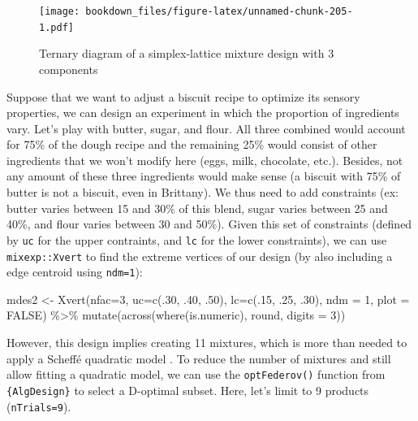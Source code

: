\documentclass[
]{krantz}
\makeatletter
\newenvironment{Shaded}{\begin{snugshade}}{\end{snugshade}}
\newcommand{\AttributeTok}[1]{\textcolor[rgb]{0.61,0.61,0.61}{#1}}
\newcommand{\ConstantTok}[1]{\textcolor[rgb]{0,0,0}{#1}}
\newcommand{\DecValTok}[1]{\textcolor[rgb]{0.06,0.06,0.06}{#1}}
\newcommand{\FunctionTok}[1]{\textcolor[rgb]{0,0,0}{#1}}
\newcommand{\NormalTok}[1]{#1}
\newcommand{\OtherTok}[1]{\textcolor[rgb]{0.37,0.37,0.37}{#1}}
\newcommand{\SpecialCharTok}[1]{\textcolor[rgb]{0,0,0}{#1}}
\newenvironment{kframe}{%
\medskip{}
\setlength{\fboxsep}{.8em}
 \def\at@end@of@kframe{}%
 \ifinner\ifhmode%
  \def\at@end@of@kframe{\end{minipage}}%
  \begin{minipage}{\columnwidth}%
 \fi\fi%
 \def\FrameCommand##1{\hskip\@totalleftmargin \hskip-\fboxsep
 \colorbox{shadecolor}{##1}\hskip-\fboxsep
     \hskip-\linewidth \hskip-\@totalleftmargin \hskip\columnwidth}%
 \MakeFramed {\advance\hsize-\width
   \@totalleftmargin\z@ \linewidth\hsize
   \@setminipage}}%
 {\par\unskip\endMakeFramed%
 \at@end@of@kframe}
\renewenvironment{Shaded}{\begin{kframe}}{\end{kframe}}
\makeatother
\begin{document}
\begin{figure}
\centering
\texttt{[image: bookdown\_files/figure-latex/unnamed-chunk-205-1.pdf]}
\caption{\label{fig:unnamed-chunk-205}Ternary diagram of a simplex-lattice mixture design with 3 components}
\end{figure}

Suppose that we want to adjust a biscuit recipe to optimize its sensory properties, we can design an experiment in which the proportion of ingredients vary. Let's play with butter, sugar, and flour. All three combined would account for 75\% of the dough recipe and the remaining 25\% would consist of other ingredients that we won't modify here (eggs, milk, chocolate, etc.). Besides, not any amount of these three ingredients would make sense (a biscuit with 75\% of butter is not a biscuit, even in Brittany). We thus need to add constraints (ex: butter varies between 15 and 30\% of this blend, sugar varies between 25 and 40\%, and flour varies between 30 and 50\%). Given this set of constraints (defined by \texttt{uc} for the upper contraints, and \texttt{lc} for the lower constraints), we can use \texttt{mixexp::Xvert} to find the extreme vertices of our design (by also including a edge centroid using \texttt{ndm=1}):

\begin{Shaded}
\begin{Highlighting}[]
\NormalTok{mdes2 }\OtherTok{\textless{}{-}} \FunctionTok{Xvert}\NormalTok{(}\AttributeTok{nfac=}\DecValTok{3}\NormalTok{, }\AttributeTok{uc=}\FunctionTok{c}\NormalTok{(.}\DecValTok{30}\NormalTok{, .}\DecValTok{40}\NormalTok{, .}\DecValTok{50}\NormalTok{), }\AttributeTok{lc=}\FunctionTok{c}\NormalTok{(.}\DecValTok{15}\NormalTok{, .}\DecValTok{25}\NormalTok{, .}\DecValTok{30}\NormalTok{), }
               \AttributeTok{ndm =} \DecValTok{1}\NormalTok{, }\AttributeTok{plot =} \ConstantTok{FALSE}\NormalTok{) }\SpecialCharTok{\%\textgreater{}\%} 
      \FunctionTok{mutate}\NormalTok{(}\FunctionTok{across}\NormalTok{(}\FunctionTok{where}\NormalTok{(is.numeric), round, }\AttributeTok{digits =} \DecValTok{3}\NormalTok{))}
\end{Highlighting}
\end{Shaded}

However, this design implies creating 11 mixtures, which is more than needed to apply a Scheffé quadratic model \citep{Lawson2016}. To reduce the number of mixtures and still allow fitting a quadratic model, we can use the \texttt{optFederov()} function from \texttt{\{AlgDesign\}} to select a D-optimal subset. Here, let's limit to 9 products (\texttt{nTrials=9}).
\end{document}
